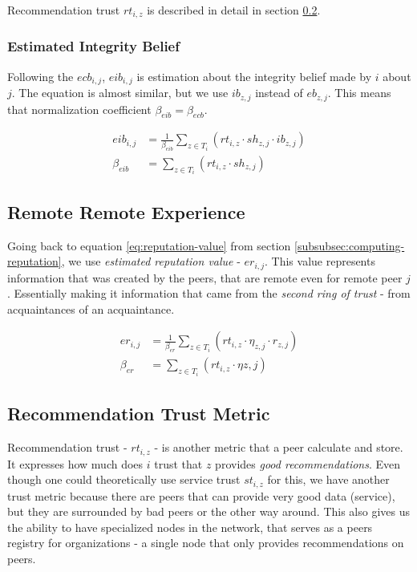\noindent
Recommendation trust $rt_{i, z}$ is described in detail in section \ref{subsec:recommendation-trust-metric}.

\subsubsection{Estimated Integrity Belief}
Following the $ecb_{i,j}$, $eib_{i,j}$ is estimation about the integrity belief made by $i$ about $j$.
The equation is almost similar, but we use $ib_{z,j}$ instead of $eb_{z,j}$.
This means that normalization coefficient $\beta_{eib} = \beta_{ecb}$.

\begin{equation}
\label{eq:estimated-integrity-belief}
\begin{split}
    eib_{i,j} &= \frac{1}{\beta_{eib}} \sum_{z \in T_{i}} \left(rt_{i, z} \cdot sh_{z, j} \cdot ib_{z, j}\right) \\
    \beta_{eib} &= \sum_{z \in T_{i}} \left(rt_{i, z} \cdot sh_{z, j}\right)
\end{split}
\end{equation}

\subsection{Remote Remote Experience}
Going back to equation \ref{eq:reputation-value} from section \ref{subsubsec:computing-reputation}, we use \textit{estimated reputation value} - $er_{i,j}$.
This value represents information that was created by the peers, that are remote even for remote peer $j$. 
Essentially making it information that came from the \textit{second ring of trust} - from acquaintances of an acquaintance.

\begin{equation}
\label{eq:estimated-reputation}
\begin{split}
    er_{i,j} &= \frac{1}{\beta_{er}} \sum_{z \in T_{i}} \left(rt_{i, z} \cdot \eta_{z, j} \cdot r_{z, j}\right) \\
    \beta_{er} &= \sum_{z \in T_{i}} \left(rt_{i, z} \cdot \eta{z, j}\right)
\end{split}
\end{equation}

\subsection{Recommendation Trust Metric}
\label{subsec:recommendation-trust-metric}
Recommendation trust - $rt_{i,z}$ - is another metric that a peer calculate and store. It expresses how much does $i$ trust that $z$ provides \textit{good recommendations}.
Even though one could theoretically use service trust $st_{i, z}$ for this,
we have another trust metric because there are peers that can provide very good data (service), but they are surrounded by bad peers or the other way around.
This also gives us the ability to have specialized nodes in the network, that serves as a peers registry for organizations - a single node that only provides recommendations on peers.

